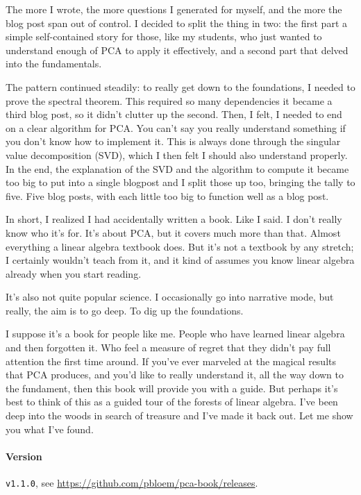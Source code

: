 \documentclass{pca}
\theoremstyle{theorem}
\theoremstyle{proof}
\begin{document}
The more I wrote, the more questions I generated for myself, and the more the blog post span out of control. I decided to split the thing in two: the first part a simple self-contained story for those, like my students, who just wanted to understand enough of PCA to apply it effectively, and a second part that delved into the fundamentals. 

The pattern continued steadily: to really get down to the foundations, I needed to prove the spectral theorem. This required so many dependencies it became a third blog post, so it didn't clutter up the second. Then, I felt, I needed to end on a clear algorithm for PCA. You can't say you really understand something if you don't know how to implement it. This is always done through the singular value decomposition (SVD), which I then felt I should also understand properly. In the end, the explanation of the SVD and the algorithm to compute it became too big to put into a single blogpost and I split those up too, bringing the tally to five. Five blog posts, with each little too big to function well as a blog post.

In short, I realized I had accidentally written a book. Like I said. I don't really know who it's for. It's about PCA, but it covers much more than that. Almost everything a linear algebra textbook does. But it's not a textbook by any stretch; I certainly wouldn't teach from it, and it kind of assumes you know linear algebra already when you start reading.

It's also not quite popular science. I occasionally go into narrative mode, but really, the aim is to go deep. To dig up the foundations.

 I suppose it's a book for people like me. People who have learned linear algebra and then forgotten it. Who feel a measure of regret that they didn't pay full attention the first time around. If you've ever marveled at the magical results that PCA produces, and you'd like to really understand it, all the way down to the fundament, then this book will provide you with a guide. But perhaps it's best to think of this as a guided tour of the forests of linear algebra. I've been deep into the woods in search of treasure and I've made it back out. Let me show you what I've found.
 
\enlargethispage{5em}

\paragraph{Version} \texttt{v1.1.0}, see \url{https://github.com/pbloem/pca-book/releases}.
\end{document}
